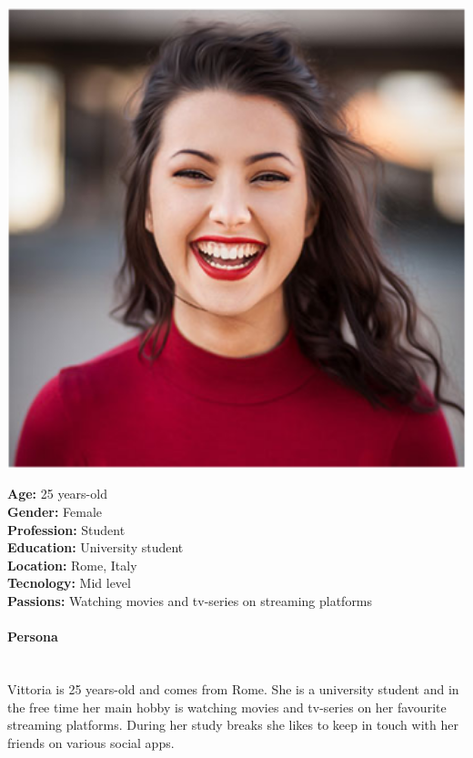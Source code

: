 \documentclass[12pt, a4paper]{article}
\numberwithin{figure}{section}
\begin{document}
\begin{minipage}{0.3\textwidth}
	\includegraphics[width=1\textwidth]{images/vittoria.png}
\end{minipage}
\hspace{0.02\linewidth}
\begin{minipage}{0.65\textwidth}
	\textbf{Age:} 25 years-old \\
	\textbf{Gender:} Female\\
	\textbf{Profession:} Student\\
	\textbf{Education:} University student\\
	\textbf{Location:} Rome, Italy\\
	\textbf{Tecnology:} Mid level\\
	\textbf{Passions:} Watching movies and tv-series on streaming platforms \\
\end{minipage}

\paragraph{Persona}\mbox{}\\
Vittoria is 25 years-old and comes from Rome. She is a university student and in the free
time her main hobby is watching movies and tv-series on her favourite streaming platforms.
During her study breaks she likes to keep in touch with her friends on various social apps.
\end{document}
